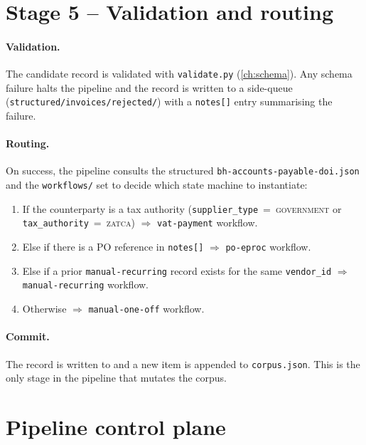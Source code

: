 \section{Stage 5 -- Validation and routing}

\paragraph{Validation.} The candidate record is validated with
\texttt{validate.py} (\cref{ch:schema}). Any schema failure halts the
pipeline and the record is written to a side-queue
(\texttt{structured/invoices/rejected/}) with a \texttt{notes[]} entry
summarising the failure.

\paragraph{Routing.} On success, the pipeline consults the structured
\texttt{bh-accounts-payable-doi.json} and the \texttt{workflows/} set
to decide which state machine to instantiate:

\begin{enumerate}
  \item If the counterparty is a tax authority
        (\texttt{supplier\_type}~=~\textsc{government} or
         \texttt{tax\_authority}~=~\textsc{zatca})
        $\Rightarrow$ \texttt{vat-payment} workflow.
  \item Else if there is a PO reference in \texttt{notes[]}
        $\Rightarrow$ \texttt{po-eproc} workflow.
  \item Else if a prior \texttt{manual-recurring} record exists for
        the same \texttt{vendor\_id}
        $\Rightarrow$ \texttt{manual-recurring} workflow.
  \item Otherwise $\Rightarrow$ \texttt{manual-one-off} workflow.
\end{enumerate}

\paragraph{Commit.} The record is written to
\corpus{} and a new item is
appended to \texttt{corpus.json}. This is the only stage in the
pipeline that mutates the corpus.

\section{Pipeline control plane}

